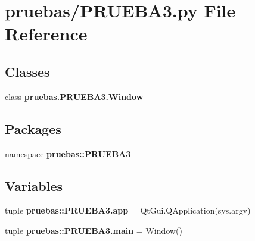 \section{pruebas/\-P\-R\-U\-E\-B\-A3.py \-File \-Reference}
\label{_p_r_u_e_b_a3_8py}
\subsection*{\-Classes}
\begin{DoxyCompactItemize}
\item 
class {\bf pruebas.\-P\-R\-U\-E\-B\-A3.\-Window}
\end{DoxyCompactItemize}
\subsection*{\-Packages}
\begin{DoxyCompactItemize}
\item 
namespace {\bf pruebas\-::\-P\-R\-U\-E\-B\-A3}
\end{DoxyCompactItemize}
\subsection*{\-Variables}
\begin{DoxyCompactItemize}
\item 
tuple {\bf pruebas\-::\-P\-R\-U\-E\-B\-A3.\-app} = \-Qt\-Gui.\-Q\-Application(sys.\-argv)
\item 
tuple {\bf pruebas\-::\-P\-R\-U\-E\-B\-A3.\-main} = \-Window()
\end{DoxyCompactItemize}
